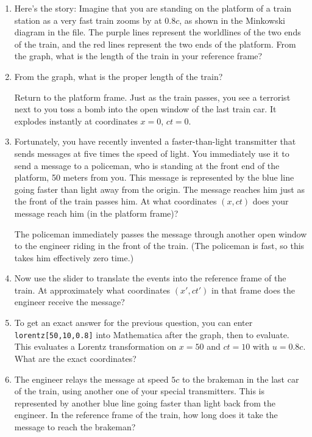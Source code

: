 \begin{enumerate}[wide]
\item Here's the story: Imagine that you are standing on the platform of a train station as a
very fast train zooms by at $0.8c$, as shown in the Minkowski diagram in the file. The purple lines represent the worldlines of the two ends of the train, and the red lines represent the two ends of the platform. From the graph, what is the length of the train in your reference frame?
\answerspace{0.7in}

\item From the graph, what is the proper length of the train?
\answerspace{0.7in}

Return to the platform frame.  Just as the train passes, you see a terrorist next to you toss a bomb into the open window of the last train car. It explodes instantly at coordinates $x = 0$, $ct = 0$.

\item Fortunately, you have recently invented a faster-than-light transmitter that sends messages at five times the speed of light. You immediately use it to send a message to a policeman, who is standing at the front end of the platform, 50 meters from you. This message is represented by the blue line going faster than light away from the origin.  The message reaches him just as the front of the train passes him. At what coordinates $(x,ct)$ does your message reach him (in the platform frame)?
\answerspace{0.7in}

The policeman immediately passes the message through another open window to the engineer riding in the front of the train. (The policeman is fast, so this takes him effectively zero time.)

\item Now use the slider to translate the events into the reference frame of the train. At approximately what coordinates 
$(x', ct')$ in that frame does the engineer receive the message?
\answerspace{0.7in}

\item To get an exact answer for the previous question, you can enter \verb!lorentz[50,10,0.8]!
into Mathematica after the graph, then  to evaluate.  This evaluates a Lorentz transformation on $x=50$ and $ct=10$ with $u=0.8c$.  What are the exact coordinates?
\answerspace{0.7in}

\item The engineer relays the message at speed $5c$ to the brakeman in the last car of the train, using another one of your special transmitters. This is represented by another blue line going faster than light back from the engineer.  In the reference frame of the train, how long does it take the message to reach the brakeman?
\answerspace{0.7in}


\end{enumerate}
